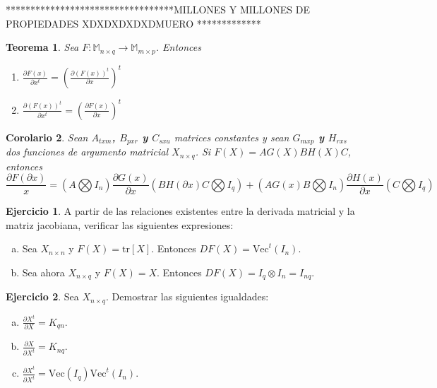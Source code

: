 \documentclass{article}
\theoremstyle{theorem-style}  %
\newtheorem{theorem}{Teorema}[section]  %
\newtheorem{corollary}[theorem]{Corolario} %
\theoremstyle{definition}
\theoremstyle{example-style}
\newtheorem{exercise}{Ejercicio}[section]
\begin{document}
**********************************MILLONES Y MILLONES DE PROPIEDADES XDXDXDXDXDMUERO *************

\begin{theorem}
	\textit{Sea $F:\mathbb{M}_{n\times q}\rightarrow \mathbb{M}_{m\times p}$. Entonces }
	\begin{enumerate}
		\item $\frac{\partial F(x)}{\partial x^t} =(\frac{\partial (F(x))^t}{\partial x})^t $
		
		\item $\frac{\partial (F(x))^t}{\partial x^t} =(\frac{\partial F(x)}{\partial x})^t$
	\end{enumerate}
\end{theorem}

\begin{corollary}
\textit{	Sean \textbf{$A_{txm}$, $B_{pxr}$ y $C_{sxu}$} matrices constantes y sean \textbf{$G_{mxp}$ y $H_{rxs}$} dos funciones de argumento matricial $X_{n\times 	q}$. Si \textbf{$F(X) = AG(X)BH(X)C$}, entonces
	\textbf{$$ \frac{\partial F(\partial x)}{x}= (A \bigotimes I_n)\frac{\partial G(x)}{\partial x}(BH(\partial x)C \bigotimes I_q) + (AG(x)B \bigotimes I_n)\frac{\partial H(x)}{\partial x}(C \bigotimes I_q)$$}
	 }
\end{corollary}



\begin{exercise}
	A partir de las relaciones existentes entre la derivada matricial y la matriz jacobiana, verificar las siguientes expresiones:
	\begin{enumerate}[a)]
		\item Sea $X_{n\times n}$ y $F(X) = \text{tr}[X].$ Entonces $DF(X) = \text{Vec}^t(I_n).$
		\item Sea ahora $X_{n\times q}$ y $F(X) =X$. Entonces $DF(X) = I_q \otimes I_n = I_{nq}$.
	\end{enumerate}
\end{exercise}

\begin{exercise}
	Sea $X_{n\times q}$. Demostrar las siguientes igualdades:
	\begin{enumerate}[a)]
		\item $\displaystyle \frac{\partial X^t}{\partial X} = K_{qn}$.
		\item $\displaystyle \frac{\partial X}{\partial X^t} = K_{nq}$.
		\item $\displaystyle \frac{\partial X^t}{\partial X^t} = \text{Vec}(I_q)\text{Vec}^t(I_n)$.
	\end{enumerate}
\end{exercise}
\end{document}
